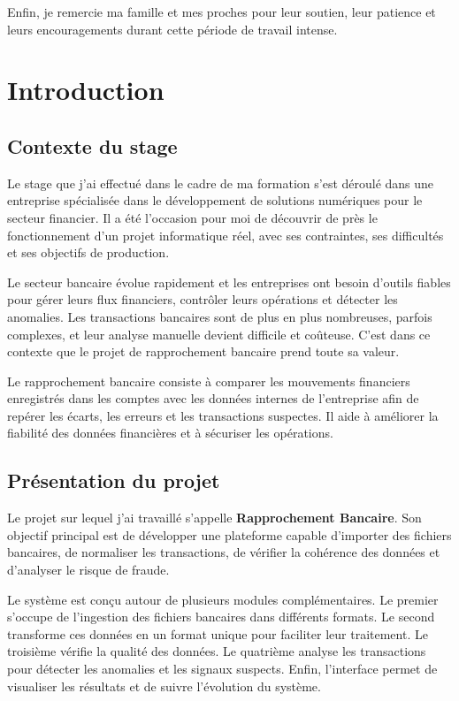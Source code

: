 ﻿\documentclass[12pt,a4paper]{report}
\begin{document}
Enfin, je remercie ma famille et mes proches pour leur soutien, leur patience et leurs encouragements durant cette période de travail intense.

\chapter{Introduction}
\section{Contexte du stage}
Le stage que j'ai effectué dans le cadre de ma formation s'est déroulé dans une entreprise spécialisée dans le développement de solutions numériques pour le secteur financier. Il a été l'occasion pour moi de découvrir de près le fonctionnement d'un projet informatique réel, avec ses contraintes, ses difficultés et ses objectifs de production.

Le secteur bancaire évolue rapidement et les entreprises ont besoin d'outils fiables pour gérer leurs flux financiers, contrôler leurs opérations et détecter les anomalies. Les transactions bancaires sont de plus en plus nombreuses, parfois complexes, et leur analyse manuelle devient difficile et coûteuse. C'est dans ce contexte que le projet de rapprochement bancaire prend toute sa valeur.

Le rapprochement bancaire consiste à comparer les mouvements financiers enregistrés dans les comptes avec les données internes de l'entreprise afin de repérer les écarts, les erreurs et les transactions suspectes. Il aide à améliorer la fiabilité des données financières et à sécuriser les opérations.

\section{Présentation du projet}
Le projet sur lequel j'ai travaillé s'appelle \textbf{Rapprochement Bancaire}. Son objectif principal est de développer une plateforme capable d'importer des fichiers bancaires, de normaliser les transactions, de vérifier la cohérence des données et d'analyser le risque de fraude.

Le système est conçu autour de plusieurs modules complémentaires. Le premier s'occupe de l'ingestion des fichiers bancaires dans différents formats. Le second transforme ces données en un format unique pour faciliter leur traitement. Le troisième vérifie la qualité des données. Le quatrième analyse les transactions pour détecter les anomalies et les signaux suspects. Enfin, l'interface permet de visualiser les résultats et de suivre l'évolution du système.
\end{document}
